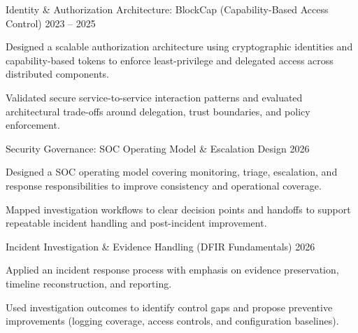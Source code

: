 \begin{cventries}
  \cventry
    {Identity \& Authorization Architecture: BlockCap (Capability-Based Access Control)}
    {2023 -- 2025}
    {
      \begin{cvitems}
        \item {Designed a scalable authorization architecture using cryptographic identities and capability-based tokens to enforce least-privilege and delegated access across distributed components.}
        \item {Validated secure service-to-service interaction patterns and evaluated architectural trade-offs around delegation, trust boundaries, and policy enforcement.}
      \end{cvitems}
    }
    \vspace{4mm}

  \cventry
    {Security Governance: SOC Operating Model \& Escalation Design}
    {2026}
    {
      \begin{cvitems}
        \item {Designed a SOC operating model covering monitoring, triage, escalation, and response responsibilities to improve consistency and operational coverage.}
        \item {Mapped investigation workflows to clear decision points and handoffs to support repeatable incident handling and post-incident improvement.}
      \end{cvitems}
    }
    \vspace{4mm}

  \cventry
    {Incident Investigation \& Evidence Handling (DFIR Fundamentals)}
    {2026}
    {
      \begin{cvitems}
        \item {Applied an incident response process with emphasis on evidence preservation, timeline reconstruction, and reporting.}
        \item {Used investigation outcomes to identify control gaps and propose preventive improvements (logging coverage, access controls, and configuration baselines).}
      \end{cvitems}
    }

\end{cventries}

\vspace{4mm}


